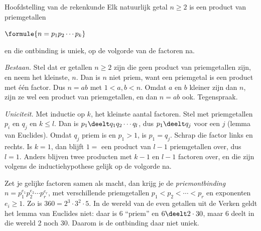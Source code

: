 \begin{theorie}
\begin{stelling}{Hoofdstelling van de rekenkunde}
Elk natuurlijk getal $n \geqslant 2$ is een product van priemgetallen

\vspace{1mm}
\qquad $\formule{n = p_1 p_2 \cdots p_k}$

\vspace{1mm}
en die ontbinding is uniek, op de volgorde van de factoren na.
\end{stelling}

\begin{bewijs}
\textit{Bestaan.} Stel dat er getallen $n \geqslant 2$ zijn die geen product van priemgetallen zijn, en neem het kleinste, $n$. Dan is $n$ niet priem, want een priemgetal is een product met één factor. Dus $n = ab$ met $1 < a, b < n$. Omdat $a$ en $b$ kleiner zijn dan $n$, zijn ze wel een product van priemgetallen, en dan $n = ab$ ook. Tegenspraak.

\textit{Uniciteit.} Met inductie op $k$, het kleinste aantal factoren. Stel
met priemgetallen $p_i$ en $q_j$ en $k \leqslant l$. Dan is $p_1 \deelt q_1 q_2 \cdots q_l$, dus $p_1 \deelt q_j$ voor een $j$ (lemma van Euclides). Omdat $q_j$ priem is en $p_1 > 1$, is $p_1 = q_j$. Schrap die factor links en rechts. Is $k = 1$, dan blijft $1 = $ een product van $l - 1$ priemgetallen over, dus $l = 1$. Anders blijven twee producten met $k - 1$ en $l - 1$ factoren over, en die zijn volgens de inductiehypothese gelijk op de volgorde na.
\end{bewijs}
\end{theorie}

Zet je gelijke factoren samen als macht, dan krijg je de \emph{priemontbinding} $n = p_1^{e_1} p_2^{e_2} \cdots p_r^{e_r}$, met verschillende priemgetallen $p_1 < p_2 < \cdots < p_r$ en exponenten $e_i \geqslant 1$. Zo is $360 = 2^3 \cdot 3^2 \cdot 5$. In de wereld van de even getallen uit de Verken geldt het lemma van Euclides niet: daar is 6 ``priem'' en $6 \deelt 2 \cdot 30$, maar 6 deelt in die wereld 2 noch 30. Daarom is de ontbinding daar niet uniek.


